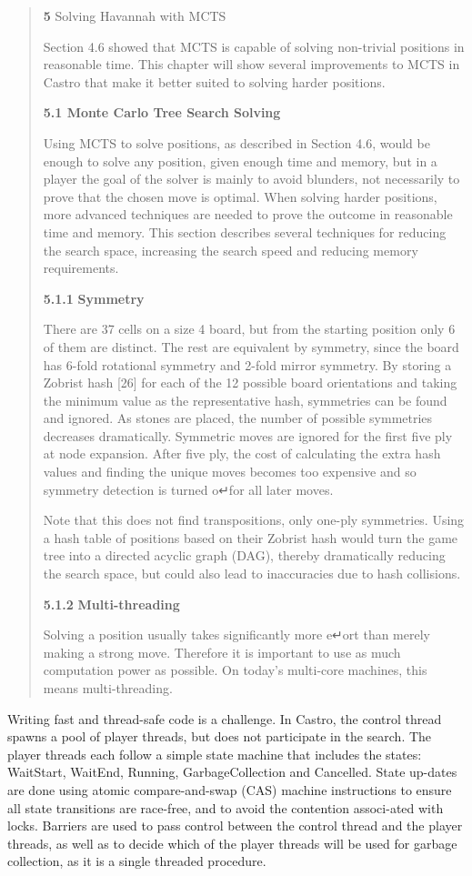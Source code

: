 \documentclass[
]{article}
\author{}
\date{}
\begin{document}
\begin{quote}
\textbf{5} Solving Havannah with MCTS

Section 4.6 showed that MCTS is capable of solving non-trivial positions
in reasonable time. This chapter will show several improvements to MCTS
in Castro that make it better suited to solving harder positions.

\textbf{5.1 Monte Carlo Tree Search Solving}

Using MCTS to solve positions, as described in Section 4.6, would be
enough to solve any position, given enough time and memory, but in a
player the goal of the solver is mainly to avoid blunders, not
necessarily to prove that the chosen move is optimal. When solving harder positions, more advanced techniques
are needed to prove the outcome in reasonable time and memory. This
section describes several techniques for reducing the search space,
increasing the search speed and reducing memory requirements.

\textbf{5.1.1} \textbf{Symmetry}

There are 37 cells on a size 4 board, but from the starting position
only 6 of them are distinct. The rest are equivalent by symmetry, since
the board has 6-fold rotational symmetry and 2-fold mirror symmetry. By
storing a Zobrist hash {[}26{]} for each of the 12 possible board
orientations and taking the minimum value as the representative hash,
symmetries can be found and ignored. As stones are placed, the number of
possible symmetries decreases dramatically. Symmetric moves are ignored
for the first five ply at node expansion. After five ply, the cost of
calculating the extra hash values and finding the unique moves becomes
too expensive and so symmetry detection is turned o↵for all later moves.

Note that this does not find transpositions, only one-ply symmetries.
Using a hash table of positions based on their Zobrist hash would turn
the game tree into a directed acyclic graph (DAG), thereby dramatically
reducing the search space, but could also lead to inaccuracies due to
hash collisions.

\textbf{5.1.2} \textbf{Multi-threading}

Solving a position usually takes significantly more e↵ort than merely
making a strong move. Therefore it is important to use as much
computation power as possible. On today's multi-core machines, this
means multi-threading.
\end{quote}

Writing fast and thread-safe code is a challenge. In Castro, the control
thread spawns a pool of player threads, but does not participate in the search.
The player threads each follow a simple state machine that includes the
states: WaitStart, WaitEnd, Running, GarbageCollection and Cancelled.
State up-dates are done using atomic compare-and-swap (CAS) machine
instructions to ensure all state transitions are race-free, and to avoid
the contention associ-ated with locks. Barriers are used to pass control
between the control thread and the player threads, as well as to decide
which of the player threads will be used for garbage collection, as it
is a single threaded procedure.
\end{document}

